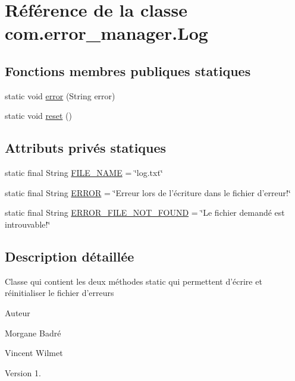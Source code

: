 \hypertarget{classcom_1_1error__manager_1_1Log}{\section{Référence de la classe com.\-error\-\_\-manager.\-Log}
\label{classcom_1_1error__manager_1_1Log}
}
\subsection*{Fonctions membres publiques statiques}
\begin{DoxyCompactItemize}
\item 
static void \hyperlink{classcom_1_1error__manager_1_1Log_a166a04ee1ab46156746a99f2350103c6}{error} (String error)
\item 
static void \hyperlink{classcom_1_1error__manager_1_1Log_aec6d0b8d25d518ad666b2007fa7f6227}{reset} ()
\end{DoxyCompactItemize}
\subsection*{Attributs privés statiques}
\begin{DoxyCompactItemize}
\item 
static final String \hyperlink{classcom_1_1error__manager_1_1Log_a473629efcbd7c2b85456b8e80ab46cd3}{F\-I\-L\-E\-\_\-\-N\-A\-M\-E} = \char`\"{}log.\-txt\char`\"{}
\item 
static final String \hyperlink{classcom_1_1error__manager_1_1Log_ab7a0b23daad7f39e20de0dac67011b82}{E\-R\-R\-O\-R} = \char`\"{}Erreur lors de l'écriture dans le fichier d'erreur!\char`\"{}
\item 
static final String \hyperlink{classcom_1_1error__manager_1_1Log_a2b163327c26f9f62da88ef109f0300c3}{E\-R\-R\-O\-R\-\_\-\-F\-I\-L\-E\-\_\-\-N\-O\-T\-\_\-\-F\-O\-U\-N\-D} = \char`\"{}Le fichier demandé est introuvable!\char`\"{}
\end{DoxyCompactItemize}


\subsection{Description détaillée}
Classe qui contient les deux méthodes static qui permettent d'écrire et réinitialiser le fichier d'erreurs \begin{DoxyAuthor}{Auteur}

\begin{DoxyItemize}
\item Morgane Badré 
\item Vincent Wilmet 
\end{DoxyItemize}
\end{DoxyAuthor}
\begin{DoxyVersion}{Version}
1. 
\end{DoxyVersion}


